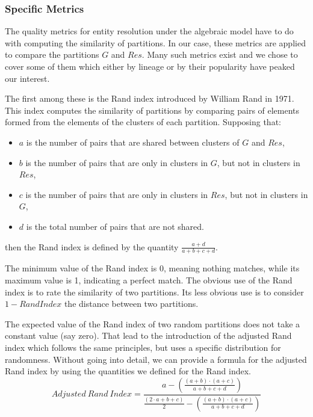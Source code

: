 \documentclass[lettersize,journal]{IEEEtran}
\begin{document}
    \subsubsection[algeval]{Specific Metrics}\label{subsubsec:algeval}

    The quality metrics for entity resolution under the algebraic model have to
    do with computing the similarity of partitions.
    In our case, these metrics are applied to compare the partitions $G$ and
    $Res$.
    Many such metrics exist\cite{hitesh2012} and we chose to cover some of them
    which either by lineage or by their popularity have peaked our interest.

    The first among these is the Rand index introduced by William Rand in
    1971\cite{rand1971}.
    This index computes the similarity of partitions by comparing pairs of
    elements formed from the elements of the clusters of each partition.
    Supposing that:
    \begin{itemize}
        \item $a$ is the number of pairs that are shared between clusters of $G$
        and $Res$,
        \item $b$ is the number of pairs that are only in clusters in $G$, but
        not in clusters in $Res$,
        \item $c$ is the number of pairs that are only in clusters in $Res$, but
        not in clusters in $G$,
        \item $d$ is the total number of pairs that are not shared.
    \end{itemize}
    then the Rand index is defined by the quantity
    $\frac{a+d}{a+b+c+d}$\cite{adjrand2001}.

    The minimum value of the Rand index is 0, meaning nothing matches, while its
    maximum value is 1, indicating a perfect match.
    The obvious use of the Rand index is to rate the similarity of two
    partitions.
    Its less obvious use is to consider $1 - Rand Index$ the distance between
    two partitions.

    The expected value of the Rand index of two random partitions does not take
    a constant value (say zero)\cite{adjrand2001}.
    That lead to the introduction of the adjusted Rand index which follows the
    same principles, but uses a specific distribution for
    randomness\cite{adjrand1985}.
    Without going into detail, we can provide a formula for the adjusted Rand
    index by using the quantities we defined for the Rand index\cite{Tal11}.
    \[
        Adjusted~Rand~Index = \frac{
            a - (\frac{(a+b)\cdot(a+c)}{a+b+c+d})
        }{
            \frac{(2\cdot a+b+c)}{2}-(\frac{(a+b)\cdot(a+c)}{a+b+c+d})
        }
    \]
\end{document}
